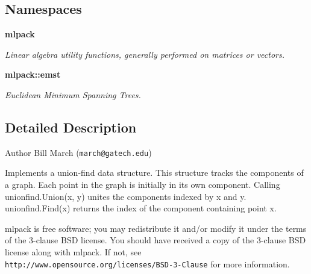 \subsection*{Namespaces}
\begin{DoxyCompactItemize}
\item 
 \textbf{ mlpack}
\begin{DoxyCompactList}\small\item\em Linear algebra utility functions, generally performed on matrices or vectors. \end{DoxyCompactList}\item 
 \textbf{ mlpack\+::emst}
\begin{DoxyCompactList}\small\item\em Euclidean Minimum Spanning Trees. \end{DoxyCompactList}\end{DoxyCompactItemize}


\subsection{Detailed Description}
\begin{DoxyAuthor}{Author}
Bill March ({\tt march@gatech.\+edu})
\end{DoxyAuthor}
Implements a union-\/find data structure. This structure tracks the components of a graph. Each point in the graph is initially in its own component. Calling unionfind.\+Union(x, y) unites the components indexed by x and y. unionfind.\+Find(x) returns the index of the component containing point x.

mlpack is free software; you may redistribute it and/or modify it under the terms of the 3-\/clause B\+SD license. You should have received a copy of the 3-\/clause B\+SD license along with mlpack. If not, see {\tt http\+://www.\+opensource.\+org/licenses/\+B\+S\+D-\/3-\/\+Clause} for more information. 